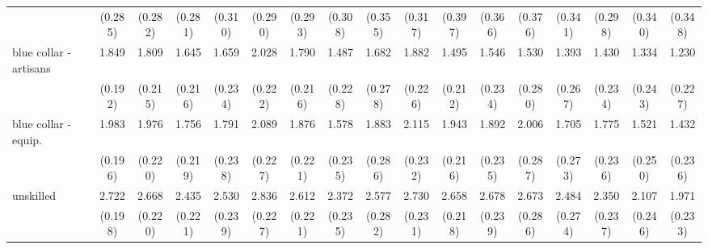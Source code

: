 {\begin{tabular}{l*{16}{c}}
                    &     (0.285)         &     (0.282)         &     (0.281)         &     (0.310)         &     (0.290)         &     (0.293)         &     (0.308)         &     (0.355)         &     (0.317)         &     (0.397)         &     (0.366)         &     (0.376)         &     (0.341)         &     (0.298)         &     (0.340)         &     (0.348)         \\
[1em]
blue collar - artisans&       1.849\sym{***}&       1.809\sym{***}&       1.645\sym{***}&       1.659\sym{***}&       2.028\sym{***}&       1.790\sym{***}&       1.487\sym{***}&       1.682\sym{***}&       1.882\sym{***}&       1.495\sym{***}&       1.546\sym{***}&       1.530\sym{***}&       1.393\sym{***}&       1.430\sym{***}&       1.334\sym{***}&       1.230\sym{***}\\
                    &     (0.192)         &     (0.215)         &     (0.216)         &     (0.234)         &     (0.222)         &     (0.216)         &     (0.228)         &     (0.278)         &     (0.226)         &     (0.212)         &     (0.234)         &     (0.280)         &     (0.267)         &     (0.234)         &     (0.243)         &     (0.227)         \\
[1em]
blue collar - equip.&       1.983\sym{***}&       1.976\sym{***}&       1.756\sym{***}&       1.791\sym{***}&       2.089\sym{***}&       1.876\sym{***}&       1.578\sym{***}&       1.883\sym{***}&       2.115\sym{***}&       1.943\sym{***}&       1.892\sym{***}&       2.006\sym{***}&       1.705\sym{***}&       1.775\sym{***}&       1.521\sym{***}&       1.432\sym{***}\\
                    &     (0.196)         &     (0.220)         &     (0.219)         &     (0.238)         &     (0.227)         &     (0.221)         &     (0.235)         &     (0.286)         &     (0.232)         &     (0.216)         &     (0.235)         &     (0.287)         &     (0.273)         &     (0.236)         &     (0.250)         &     (0.236)         \\
[1em]
unskilled           &       2.722\sym{***}&       2.668\sym{***}&       2.435\sym{***}&       2.530\sym{***}&       2.836\sym{***}&       2.612\sym{***}&       2.372\sym{***}&       2.577\sym{***}&       2.730\sym{***}&       2.658\sym{***}&       2.678\sym{***}&       2.673\sym{***}&       2.484\sym{***}&       2.350\sym{***}&       2.107\sym{***}&       1.971\sym{***}\\
                    &     (0.198)         &     (0.220)         &     (0.221)         &     (0.239)         &     (0.227)         &     (0.221)         &     (0.235)         &     (0.282)         &     (0.231)         &     (0.218)         &     (0.239)         &     (0.286)         &     (0.274)         &     (0.237)         &     (0.246)         &     (0.233)         \\

\end{tabular}}
